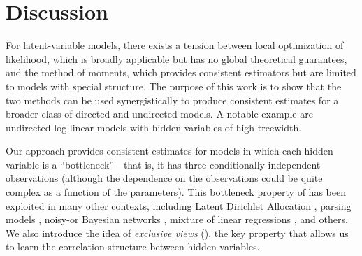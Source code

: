 \section{Discussion}
\label{sec:discussion}

For latent-variable models,
there exists a tension between
local optimization of likelihood,
which is broadly applicable but has no global theoretical guarantees,
and the method of moments, which provides consistent estimators
but are limited to models with special structure.
The purpose of this work is to show that the two methods
can be used synergistically to produce consistent estimates
for a broader class of directed and undirected models.
A notable example are undirected log-linear models with hidden variables of
high treewidth.


Our approach provides consistent estimates for
models in which each hidden variable is a ``bottleneck''---that is,
it has three conditionally independent observations
(although the dependence on the observations could be quite complex as a function of the parameters).
This bottleneck property of \citet{anandkumar13tensor}
has been exploited in many other contexts,
including Latent Dirichlet Allocation \cite{anandkumar12lda},
parsing models \cite{hsu12identifiability},
noisy-or Bayesian networks \cite{halpern13noisyor},
mixture of linear regressions \cite{chaganty13regression},
and others.
We also introduce the idea of \emph{exclusive views} (),
the key property that allows us to learn the correlation structure between hidden variables.



